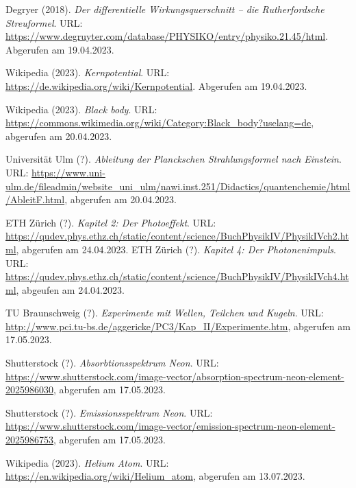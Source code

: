 \begin{thebibliography}{99}
     Degryer (2018). \emph{Der differentielle Wirkungsquerschnitt – die Rutherfordsche Streuformel}. URL: \url{https://www.degruyter.com/database/PHYSIKO/entry/physiko.21.45/html}. Abgerufen am 19.04.2023. 

     Wikipedia (2023). \emph{Kernpotential}. URL: \url{https://de.wikipedia.org/wiki/Kernpotential}. Abgerufen am 19.04.2023. 

     Wikipedia (2023). \emph{Black body}. URL: \url{https://commons.wikimedia.org/wiki/Category:Black_body?uselang=de}, abgerufen am 20.04.2023.

     Universität Ulm (?). \emph{Ableitung der Planckschen Strahlungsformel nach Einstein}. URL: \url{https://www.uni-ulm.de/fileadmin/website_uni_ulm/nawi.inst.251/Didactics/quantenchemie/html/AbleitF.html}, abgerufen am 20.04.2023.

     ETH Zürich (?). \emph{Kapitel 2: Der Photoeffekt}. URL: \url{https://qudev.phys.ethz.ch/static/content/science/BuchPhysikIV/PhysikIVch2.html}, abgerufen am 24.04.2023.
     ETH Zürich (?). \emph{Kapitel 4: Der Photonenimpuls}. URL: \url{https://qudev.phys.ethz.ch/static/content/science/BuchPhysikIV/PhysikIVch4.html}, abgeufen am 24.04.2023.  

     TU Braunschweig (?). \emph{Experimente mit Wellen, Teilchen und Kugeln}. URL: \url{http://www.pci.tu-bs.de/aggericke/PC3/Kap_II/Experimente.htm}, abgerufen am 17.05.2023. 

     Shutterstock (?). \emph{Absorbtionsspektrum Neon}. URL: \url{https://www.shutterstock.com/image-vector/absorption-spectrum-neon-element-2025986030}, abgerufen am 17.05.2023.

     Shutterstock (?). \emph{Emissionsspektrum Neon}. URL: \url{https://www.shutterstock.com/image-vector/emission-spectrum-neon-element-2025986753}, abgerufen am 17.05.2023.

     Wikipedia (2023). \emph{Helium Atom}. URL: \url{https://en.wikipedia.org/wiki/Helium_atom}, abgerufen am 13.07.2023.
\end{thebibliography}
